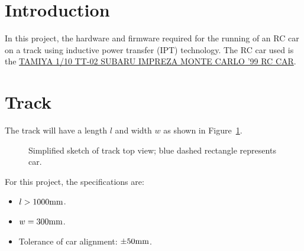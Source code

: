 


    \maketitle

    \section{Introduction}
    In this project, the hardware and firmware required for the running of an RC car on a track using inductive power transfer (IPT) 
    technology. The RC car used is the \href{https://www.rchobbies.co.nz/tamiya-1-10-tt-02-subaru-impreza-monte-carlo-99-rc-car/}
    {TAMIYA 1/10 TT-02 SUBARU IMPREZA MONTE CARLO '99 RC CAR}. 

    \section{Track}
    The track will have a length $l$ and width $w$ as shown in Figure~\ref{track_top_view}. 
    \begin{figure}[H]
        \centering 
        \caption{Simplified sketch of track top view; blue dashed rectangle represents car.}\label{track_top_view}
    \end{figure}

    For this project, the specifications are: 
    \begin{itemize}
        \item $l > 1000\rm mm$. 
        \item $w = 300\rm mm$. 
        \item Tolerance of car alignment\footnotemark: $\pm 50\rm mm$. 
    \end{itemize}


